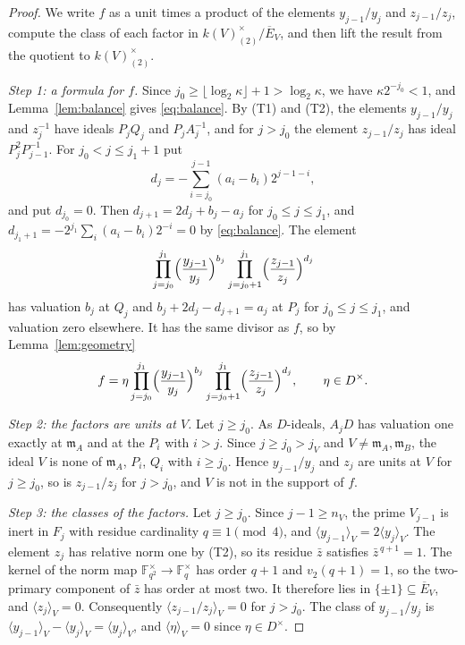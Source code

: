 \documentclass[11pt]{article}
\theoremstyle{plain}
\theoremstyle{definition}
\theoremstyle{remark}
\newcommand{\F}{\mathbb F}
\newcommand{\EA}{\mathfrak m_A}
\newcommand{\EB}{\mathfrak m_B}
\begin{document}
\begin{proof}
We write $f$ as a unit times a product of the elements $y_{j-1}/y_j$ and
$z_{j-1}/z_j$, compute the class of each factor in
$k(V)^\times_{(2)}/\overline E_V$, and then lift the result from the
quotient to $k(V)^\times_{(2)}$.

\emph{Step 1: a formula for $f$.}  Since
$j_0\geq\lfloor\log_2\kappa\rfloor+1>\log_2\kappa$, we have
$\kappa2^{-j_0}<1$, and Lemma~\ref{lem:balance} gives \eqref{eq:balance}.
By (T1) and (T2), the elements $y_{j-1}/y_j$ and $z_j^{-1}$ have ideals
$P_jQ_j$ and $P_jA_j^{-1}$, and for $j>j_0$ the element $z_{j-1}/z_j$ has
ideal $P_j^2P_{j-1}^{-1}$.  For $j_0<j\leq j_1+1$ put
\[
 d_j=-\sum_{i=j_0}^{j-1}(a_i-b_i)2^{j-1-i},
\]
and put $d_{j_0}=0$.  Then $d_{j+1}=2d_j+b_j-a_j$ for
$j_0\leq j\leq j_1$, and $d_{j_1+1}=-2^{j_1}\sum_{i}(a_i-b_i)2^{-i}=0$ by
\eqref{eq:balance}.  The element
\[
 \prod_{j=j_0}^{j_1} \Bigl(\frac{y_{j-1}}{y_j}\Bigr)^{b_j}
       \prod_{j=j_0+1}^{j_1} \Bigl(\frac{z_{j-1}}{z_j}\Bigr)^{d_j}
\]
has valuation $b_j$ at $Q_j$ and $b_j+2d_j-d_{j+1}=a_j$ at $P_j$ for
$j_0\leq j\leq j_1$, and valuation zero elsewhere.  It has the same
divisor as $f$, so by Lemma~\ref{lem:geometry}
\[
 f=\eta\prod_{j=j_0}^{j_1} \Bigl(\frac{y_{j-1}}{y_j}\Bigr)^{b_j}
       \prod_{j=j_0+1}^{j_1} \Bigl(\frac{z_{j-1}}{z_j}\Bigr)^{d_j},
 \qquad \eta\in D^\times.
\]

\emph{Step 2: the factors are units at $V$.}  Let $j\geq j_0$.  As
$D$-ideals, $A_jD$ has valuation one exactly at $\EA$ and at the $P_i$
with $i>j$.  Since $j\geq j_0>j_V$ and $V\neq\EA,\EB$, the ideal $V$ is
none of $\EA$, $P_i$, $Q_i$ with $i\geq j_0$.  Hence $y_{j-1}/y_j$ and
$z_j$ are units at $V$ for $j\geq j_0$, so is $z_{j-1}/z_j$ for $j>j_0$,
and $V$ is not in the support of $f$.

\emph{Step 3: the classes of the factors.}  Let $j\geq j_0$.  Since
$j-1\geq n_V$, the prime $V_{j-1}$ is inert in $F_j$ with residue
cardinality $q\equiv1\pmod4$, and $\langle y_{j-1}\rangle_V=2\langle y_j\rangle_V$.  The element
$z_j$ has relative norm one by (T2), so its residue $\bar z$ satisfies
$\bar z^{\,q+1}=1$.  The kernel of the norm map $\F_{q^2}^\times\to
\F_q^\times$ has order $q+1$ and $v_2(q+1)=1$, so the two-primary
component of $\bar z$ has order at most two.  It therefore lies in
$\{\pm1\}\subseteq\overline E_V$, and $\langle z_j\rangle_V=0$.  Consequently
$\langle z_{j-1}/z_j\rangle_V=0$ for $j>j_0$.  The class of $y_{j-1}/y_j$ is
$\langle y_{j-1}\rangle_V-\langle y_j\rangle_V=\langle y_j\rangle_V$, and $\langle \eta\rangle_V=0$ since
$\eta\in D^\times$.


\end{proof}
\end{document}
